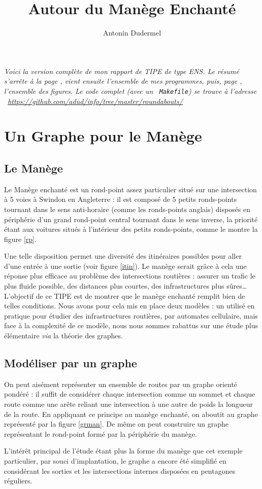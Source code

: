 \documentclass[11pt]{article}
\title{Autour du Manège Enchanté}
\date{}
\author{Antonin Dudermel}
\begin{document}

\maketitle

{\it \small
Voici la version complète de mon rapport de TIPE de type ENS.  Le résumé s'arrête à la page \pageref{finres}, vient ensuite l'ensemble de mes programmes, puis, page \pageref{figs}, l'ensemble des figures. Le code complet (avec un ~\verb+Makefile+) se trouve à l'adresse ~\url{https://github.com/adud/info/tree/master/roundabouts/}}

\section{Un Graphe pour le Manège}
	\subsection{Le Manège}
	
Le Manège enchanté est un rond-point assez particulier situé sur une intersection à 5 voies à Swindon en Angleterre : il est composé de 5 petits ronds-points tournant dans le sens anti-horaire (comme les ronds-points anglais) disposés en périphérie d'un grand rond-point central tournant dans le sens inverse, la priorité étant aux voitures situés à l'intérieur des petits ronds-points, comme le montre la figure \ref{rp}.

Une telle disposition permet une diversité des itinéraires possibles pour aller d'une entrée à une sortie (voir figure \ref{itin}). Le manège serait grâce à cela une réponse plus efficace au problème des intersections routières : assurer un trafic le plus fluide possible, des distances plus courtes, des infrastructures plus sûres… L'objectif de ce TIPE est de montrer que le manège enchanté remplit bien de telles conditions. Nous avons pour cela mis en place deux modèles : un utilisé en pratique pour étudier des infrastructures routières, par automates cellulaire, mais face à la complexité de ce modèle, nous nous sommes rabattus sur une étude plus élémentaire {\it via} la théorie des graphes.


	\subsection{Modéliser par un graphe}

On peut aisément représenter un ensemble de routes par un graphe orienté pondéré : il suffit de considérer chaque intersection comme un sommet et chaque route comme une arête reliant une intersection à une autre de poids la longueur de la route. En appliquant ce principe au manège enchanté, on aboutit au graphe représenté par la figure \ref{grman}. De même on peut construire un graphe représentant le rond-point formé par la périphérie du manège. \par
L'intérêt principal de l'étude étant plus la forme du manège que cet exemple particulier, par souci d'implantation, le graphe a encore été simplifié en considérant les sorties et les intersections internes disposées en pentagones réguliers.
\end{document}
